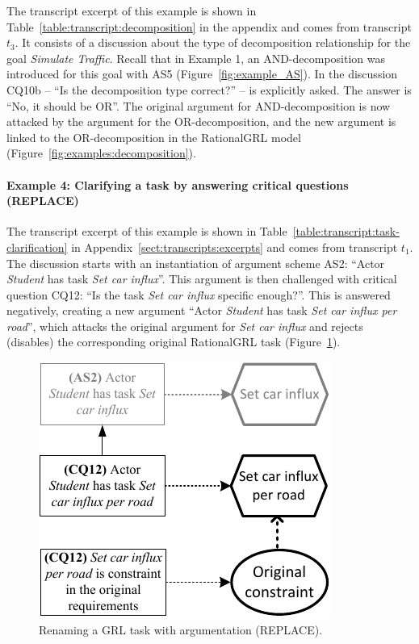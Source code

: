 The transcript excerpt of this example is shown in Table~\ref{table:transcript:decomposition} in the appendix and comes from transcript $t_3$. It consists of a discussion about the type of decomposition relationship for the goal \emph{Simulate Traffic}. Recall that in Example 1, an AND-decomposition was introduced for this goal with AS5 (Figure~\ref{fig:example_AS}). In the discussion CQ10b -- ``Is the decomposition type correct?'' -- is explicitly asked. The answer is ``No, it should be OR''. The original argument for AND-decomposition is now attacked  by the argument for the OR-decomposition, and the new argument is linked to the OR-decomposition in the RationalGRL model (Figure~\ref{fig:examples:decomposition}). 

\paragraph{Example 4: Clarifying a task by answering critical questions (\textsf{REPLACE})}

The transcript excerpt of this example is shown in Table~\ref{table:transcript:task-clarification} in Appendix~\ref{sect:transcripts:excerpts} and comes from transcript $t_1$. The discussion starts with an instantiation of argument scheme AS2: ``Actor \emph{Student} has task \emph{Set car influx}''. This argument is then challenged with critical question CQ12: ``Is the task \emph{Set car influx} specific enough?''. This is answered negatively, creating a new argument ``Actor \emph{Student} has task \emph{Set car influx per road}'', which attacks the original argument for \emph{Set car influx} and rejects (disables) the corresponding original RationalGRL task (Figure~\ref{fig:examples:clarification}). 

\begin{figure}[b]
\centering
\includegraphics[]{img/fig_example_rename.pdf}
\caption{Renaming a GRL task with argumentation (\textsf{REPLACE)}.}
\label{fig:examples:clarification}
\end{figure}

